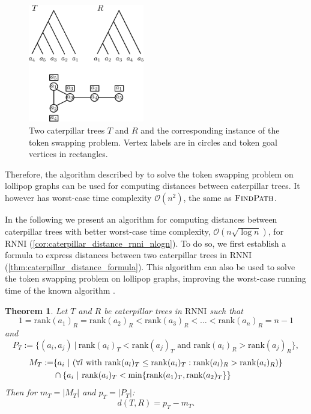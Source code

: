 \documentclass[11pt]{amsart}
\newtheorem{theorem}{Theorem}
\newcommand{\rnni}{\mathrm{RNNI}}
\newcommand{\findpath}{\textsc{FindPath}}
\newcommand{\rank}{\mathrm{rank}}
\renewcommand{\O}{\mathcal O}
\begin{document}
\begin{figure}[ht]
	\includegraphics[width=0.45\textwidth]{tsp_caterpillar.eps}
	\caption{Two caterpillar trees $T$ and $R$ and the corresponding instance of the token swapping problem.
	Vertex labels are in circles and token goal vertices in rectangles.}
	\label{fig:tsp_caterpillar}
\end{figure}

Therefore, the algorithm described by \textcite{Kawahara2017-ey} to solve the token swapping problem on lollipop graphs can be used for computing distances between caterpillar trees.
It however has worst-case time complexity $\O(n^2)$, the same as $\findpath$.

In the following we present an algorithm for computing distances between caterpillar trees with better worst-case time complexity, $\O(n \sqrt{\log n})$, for $\rnni$ (\autoref{cor:caterpillar_distance_rnni_nlogn}).
To do so, we first establish a formula to express distances between two caterpillar trees in $\rnni$ (\autoref{thm:caterpillar_distance_formula}).
This algorithm can also be used to solve the token swapping problem on lollipop graphs, improving the worst-case running time of the known algorithm \autocite{Kawahara2017-ey}.

\begin{theorem}
	Let $T$ and $R$ be caterpillar trees in $\rnni$ such that \[1 = \rank(a_1)_R = \rank(a_2)_R < \rank(a_3)_R < \ldots < \rank(a_n)_R = n-1\]
	and
	\[P_T := \{(a_i,a_j)\ |\  \rank(a_i)_T < \rank(a_j)_T \text{ and } \rank(a_i)_R > \rank(a_j)_R\},\]
	\begin{align*}
		M_T := &\{a_i\ |\  (\forall l \textnormal{ with } \rank(a_l)_T \leq \rank(a_i)_T: \rank(a_l)_R > \rank(a_i)_R)\} \\
		& \cap \{a_i \ |\  \rank(a_i)_T < \min\{\rank(a_1)_T, \rank(a_2)_T\}\}
	\end{align*}
	Then for ${m_T = |M_T|}$ and ${p_T = |P_T|}$:
	\[d(T,R) = p_T - m_T.\]
	\label{thm:caterpillar_distance_formula}
\end{theorem}
\vspace{-.5cm}
\end{document}
